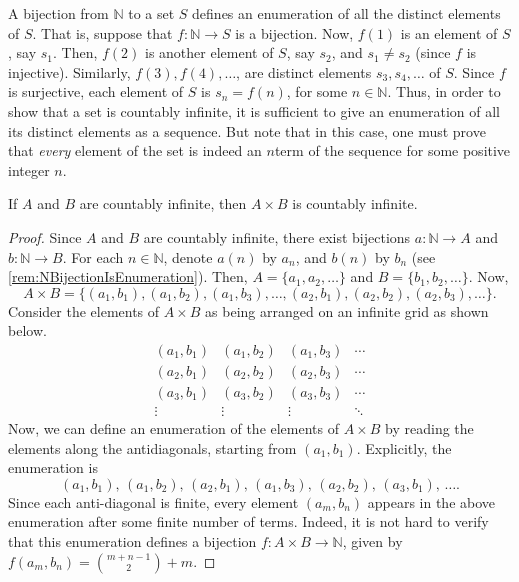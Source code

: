 \begin{Remark*}\label{rem:NBijectionIsEnumeration}
A bijection from $\mathbb N$ to a set $S$ defines an enumeration of all the distinct elements of $S$. That is, suppose that $f \colon \mathbb N \to S$ is a bijection. Now, $f(1)$ is an element of $S$, say $s_1$. Then, $f(2)$ is another element of $S$, say $s_2$, and $s_1 \ne s_2$ (since $f$ is injective). Similarly, $f(3), f(4), \ldots$, are distinct elements $s_3, s_4, \ldots$ of $S$. Since $f$ is surjective, each element of $S$ is $s_n = f(n)$, for some $n \in \mathbb N$. Thus, in order to show that a set is countably infinite, it is sufficient to give an enumeration of all its distinct elements as a sequence. But note that in this case, one must prove that \emph{every} element of the set is indeed an $n$\nth term of the sequence for some positive integer $n$.
\end{Remark*}

\begin{Lemma}\label{lem:CIxCI=CI}
If $A$ and $B$ are countably infinite, then $A \times B$ is countably infinite.
\end{Lemma}

\begin{proof}
Since $A$ and $B$ are countably infinite, there exist bijections $a \colon \mathbb N \to A$ and $b \colon \mathbb N \to B$. For each $n \in \mathbb N$, denote $a(n)$ by $a_n$, and $b(n)$ by $b_n$ (see \cref{rem:NBijectionIsEnumeration}). Then, $A = \{a_1, a_2, \ldots\}$ and $B = \{b_1, b_2, \ldots\}$. Now,
\begin{equation*}
A \times B = \{(a_1, b_1), (a_1, b_2), (a_1, b_3), \ldots, (a_2, b_1), (a_2, b_2), (a_2, b_3), \ldots\}.
\end{equation*}
Consider the elements of $A \times B$ as being arranged on an infinite grid as shown below.
\begin{equation*}
\begin{matrix}
(a_1, b_1) & (a_1, b_2) & (a_1, b_3) & \cdots \\
(a_2, b_1) & (a_2, b_2) & (a_2, b_3) & \cdots \\
(a_3, b_1) & (a_3, b_2) & (a_3, b_3) & \cdots \\
\vdots & \vdots & \vdots & \ddots
\end{matrix}
\end{equation*}
Now, we can define an enumeration of the elements of $A \times B$ by reading the elements along the antidiagonals, starting from $(a_1, b_1)$. Explicitly, the enumeration is
\begin{equation*}
(a_1, b_1),\, (a_1, b_2),\, (a_2, b_1),\, (a_1, b_3),\, (a_2, b_2),\, (a_3, b_1),\, \ldots.
\end{equation*}
Since each anti-diagonal is finite, every element $(a_m, b_n)$ appears in the above enumeration after some finite number of terms. Indeed, it is not hard to verify that this enumeration defines a bijection $f \colon A \times B \to \mathbb N$, given by $f(a_m, b_n) = \binom {m + n - 1} 2 + m$.
\end{proof}

